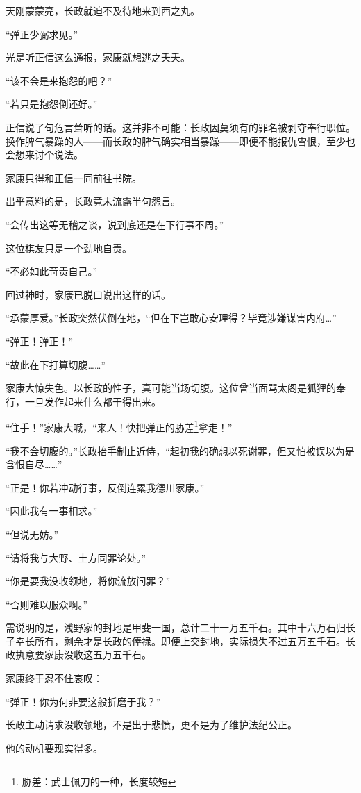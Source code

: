 \documentclass[
]{book}
\begin{document}
天刚蒙蒙亮，长政就迫不及待地来到西之丸。

``弹正少弼求见。''

光是听正信这么通报，家康就想逃之夭夭。

``该不会是来抱怨的吧？''

``若只是抱怨倒还好。''

正信说了句危言耸听的话。这并非不可能：长政因莫须有的罪名被剥夺奉行职位。换作脾气暴躁的人------而长政的脾气确实相当暴躁------即便不能报仇雪恨，至少也会想来讨个说法。

家康只得和正信一同前往书院。

出乎意料的是，长政竟未流露半句怨言。

``会传出这等无稽之谈，说到底还是在下行事不周。''

这位棋友只是一个劲地自责。

``不必如此苛责自己。''

回过神时，家康已脱口说出这样的话。

``承蒙厚爱。''长政突然伏倒在地，``但在下岂敢心安理得？毕竟涉嫌谋害内府\ldots{}''

``弹正！弹正！''

``故此在下打算切腹\ldots\ldots{}''

家康大惊失色。以长政的性子，真可能当场切腹。这位曾当面骂太阁是狐狸的奉行，一旦发作起来什么都干得出来。

``住手！''家康大喊，``来人！快把弹正的胁差\footnote{胁差：武士佩刀的一种，长度较短}拿走！''

``我不会切腹的。''长政抬手制止近侍，``起初我的确想以死谢罪，但又怕被误以为是含恨自尽\ldots\ldots{}''

``正是！你若冲动行事，反倒连累我德川家康。''

``因此我有一事相求。''

``但说无妨。''

``请将我与大野、土方同罪论处。''

``你是要我没收领地，将你流放问罪？''

``否则难以服众啊。''

需说明的是，浅野家的封地是甲斐一国，总计二十一万五千石。其中十六万石归长子幸长所有，剩余才是长政的俸禄。即便上交封地，实际损失不过五万五千石。长政执意要家康没收这五万五千石。

家康终于忍不住哀叹：

``弹正！你为何非要这般折磨于我？''

长政主动请求没收领地，不是出于悲愤，更不是为了维护法纪公正。

他的动机要现实得多。
\end{document}
